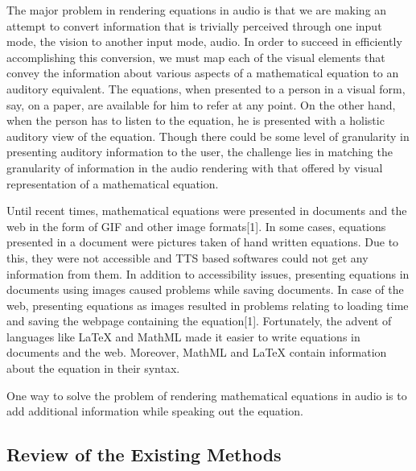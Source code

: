 \documentclass{article}
\begin{document}
The major problem in rendering equations in audio is that we are making an attempt to convert information that is trivially perceived through one input mode, the vision to another input mode, audio. In order to succeed in efficiently accomplishing this conversion, we must map each of the visual elements that convey the information about various aspects of a mathematical equation to an auditory equivalent. The equations, when presented to a person in a visual form, say, on a paper, are available for him to refer at any point. On the other hand, when the person has to listen to the equation, he is presented with a holistic auditory view of the equation. Though there could be some level of
granularity in presenting auditory information to the user, the challenge lies in matching the granularity of information in the audio rendering with that offered by visual representation of a mathematical equation. 



Until recent times, mathematical equations were presented in documents and the web in the form of GIF and other image formats[1]. In some cases, equations presented in a document were pictures taken of hand written equations. Due to this, they were not accessible and TTS based softwares could not get any information from them. In addition to accessibility issues, presenting equations in documents using images caused problems while saving documents. In case of the web, presenting equations as images resulted in problems relating to loading time and saving the webpage containing the equation[1].
Fortunately, the advent of languages like LaTeX and MathML made it easier to write equations in documents and the web. Moreover, MathML and LaTeX contain information about the equation in their syntax. 



One way to solve the problem of rendering mathematical equations in audio is to add additional information while speaking out the equation. 







\subsection{Review of the Existing Methods}
\label{ssec:format}
\end{document}
